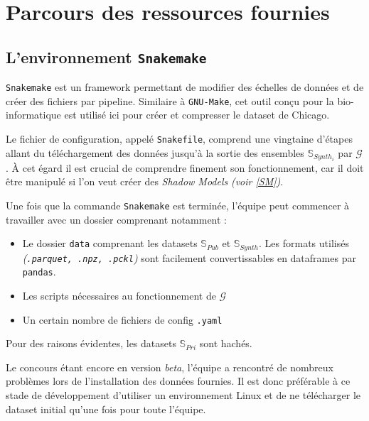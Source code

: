 \chapter{Parcours des ressources fournies}
    \section{L'environnement \texttt{Snakemake}}

        \texttt{Snakemake} est un framework permettant de modifier des échelles de données et de créer des fichiers par pipeline. Similaire à \texttt{GNU-Make}, cet outil conçu pour la bio-informatique est utilisé ici pour créer et compresser le dataset de Chicago.

        Le fichier de configuration, appelé \texttt{Snakefile}, comprend une vingtaine d'étapes allant du téléchargement des données jusqu'à la sortie des ensembles  $\mathbb S_{Synth_i}$ par $\mathcal G$. À cet égard il est crucial de comprendre finement son fonctionnement, car il doit être manipulé si l'on veut créer des \textit{Shadow Models} \textit{(voir \ref{SM})}.

        Une fois que la commande \texttt{Snakemake} est terminée, l'équipe peut commencer à travailler avec un dossier comprenant notamment :
        \begin{itemize}
            \item Le dossier \texttt{data} comprenant les datasets $\mathbb{S}_{Pub}$ et $\mathbb{S}_{Synth}$. Les formats utilisés \textit{(\texttt{.parquet, .npz, .pckl})} sont facilement convertissables en dataframes par \texttt{pandas}.
            \item Les scripts nécessaires au fonctionnement de $\mathcal G$
            \item Un certain nombre de fichiers de config \texttt{.yaml}
        \end{itemize}

        Pour des raisons évidentes, les datasets $\mathbb{S}_{Pri}$ sont hachés.

        \begin{tcolorbox}[colback=linkborder_Color!5!white,colframe=linkborder_Color!75!black]
            Le concours étant encore en version \textit{beta}, l'équipe a rencontré de nombreux problèmes lors de l'installation des données fournies. Il est donc préférable à ce stade de développement d'utiliser un environnement Linux et de ne télécharger le dataset initial qu'une fois pour toute l'équipe.
        \end{tcolorbox}


